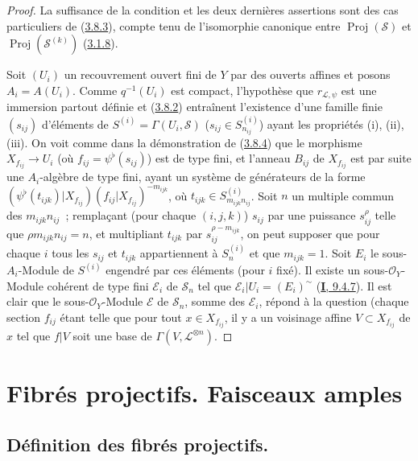 \begin{proof}
La suffisance de la condition et les deux dernières assertions sont des cas
particuliers de (\hyperref[II.3.8.3-fr]{3.8.3}), compte tenu de l'isomorphie
canonique entre $\operatorname{Proj}(\mathcal{S})$ et
$\operatorname{Proj}(\mathcal{S}^{(k)})$
(\hyperref[II.3.1.8-fr]{3.1.8}).

Soit $(U_i)$ un recouvrement ouvert fini de $Y$ par des ouverts affines et
posons $A_i=A(U_i)$. Comme $q^{-1}(U_i)$ est compact, l'hypothèse que
$r_{\mathcal{L},\psi}$ est une immersion partout définie et
(\hyperref[II.3.8.2-fr]{3.8.2}) entraînent l'existence d'une famille finie
$(s_{ij})$ d'éléments de
$S^{(i)}=\Gamma(U_i,\mathcal{S})$ ($s_{ij}\in S_{n_{ij}}^{(i)}$) ayant les
propriétés (i), (ii), (iii). On voit comme dans la démonstration de
(\hyperref[II.3.8.4-fr]{3.8.4}) que le morphisme $X_{f_{ij}}\to U_i$ (où
$f_{ij}=\psi^\flat(s_{ij})$) est de type fini, et l'anneau $B_{ij}$ de
$X_{f_{ij}}$ est par suite une $A_i$-algèbre de type fini, ayant un système de
générateurs de la forme
$(\psi^\flat(t_{ijk})|X_{f_{ij}})(f_{ij}|X_{f_{ij}})^{-m_{ijk}}$, où
$t_{ijk}\in S_{m_{ijk}n_{ij}}^{(i)}$. Soit $n$ un multiple commun des
$m_{ijk}n_{ij}$~; remplaçant (pour chaque $(i,j,k)$) $s_{ij}$ par une
puissance $s_{ij}^\rho$ telle que $\rho m_{ijk}n_{ij}=n$, et multipliant
$t_{ijk}$ par $s_{ij}^{\rho-m_{ijk}}$, on peut supposer que pour chaque $i$
tous les $s_{ij}$ et $t_{ijk}$ appartiennent à $S_n^{(i)}$ et que
$m_{ijk}=1$. Soit $E_i$ le sous-$A_i$-Module de $S^{(i)}$ engendré par ces
éléments (pour $i$ fixé). Il existe un sous-$\mathcal{O}_Y$-Module cohérent de
type
fini $\mathcal{E}_i$ de $\mathcal{S}_n$ tel que
$\mathcal{E}_i|U_i=(E_i)^{\sim}$
(\hyperref[I.9.4.7-fr]{\textbf{I}, 9.4.7}). Il est clair que le
sous-$\mathcal{O}_Y$-Module $\mathcal{E}$ de $\mathcal{S}_n$, somme des
$\mathcal{E}_i$, répond à la question (chaque section $f_{ij}$ étant telle
que pour tout $x\in X_{f_{ij}}$, il y a un voisinage affine
$V\subset X_{f_{ij}}$ de $x$ tel que $f|V$ soit une base de
$\Gamma(V,\mathcal{L}^{\otimes n})$.
\end{proof}

\section{Fibrés projectifs. Faisceaux amples}
\label{section:II.4-fr}

\subsection{Définition des fibrés projectifs.}
\label{subsection:II.4.1-fr}

